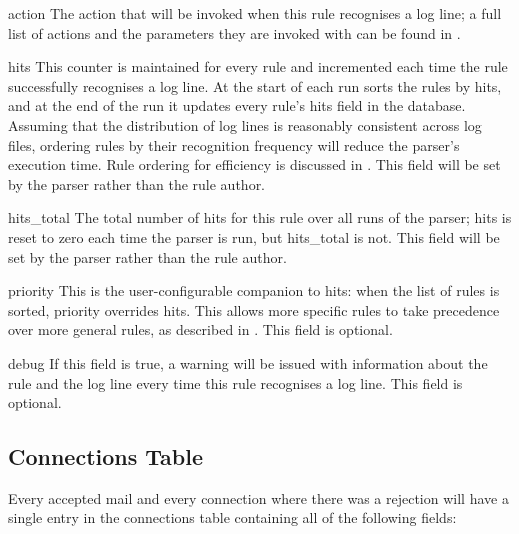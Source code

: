 \begin{boldeqlist}
    \item [action] The action that will be invoked when this rule
        recognises a log line; a full list of actions and the parameters
        they are invoked with can be found in .

    \item [hits] This counter is maintained for every rule and incremented
        each time the rule successfully recognises a log line.  At the
        start of each run \parsername{} sorts the rules by hits, and at the end of the run it updates
        every rule's hits field in the database.  Assuming that the
        distribution of log lines is reasonably consistent across log
        files, ordering rules by their recognition frequency will reduce
        the parser's execution time.  Rule ordering for efficiency is
        discussed in .  This field
        will be set by the parser rather than the rule author.

    \item [hits\_total] The total number of hits for this rule over all
        runs of the parser; hits is reset to zero each time the parser is
        run, but hits\_total is not.  This field will be set by the parser
        rather than the rule author.

    \item [priority] This is the user-configurable companion to hits: when
        the list of rules is sorted, priority overrides hits.  This allows
        more specific rules to take precedence over more general rules, as
        described in .  This field is
        optional.

    \item [debug] If this field is true, a warning will be issued with
        information about the rule and the log line every time this rule
        recognises a log line.  This field is optional.

\end{boldeqlist}

\subsection{Connections Table}

\label{connections table}

Every accepted mail and every connection where there was a rejection will
have a single entry in the connections table containing all of the
following fields:

